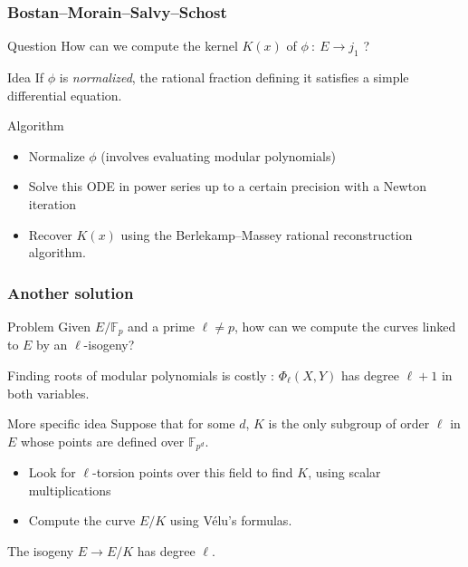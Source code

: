 \documentclass[12pt]{beamer}
\newcommand{\F}{\ensuremath{\mathbb{F}}}
\begin{document}
\begin{frame}
 \frametitle{Bostan--Morain--Salvy--Schost \cite{BMSS}}
 
 \vspace{-3mm}
 \begin{alertblock}{Question}
  How can we compute the kernel $K(x)$ of $\phi\ :\ E \to j_1$ ?
 \end{alertblock}
 
 \pause
 
 \begin{block}{Idea}
  If $\phi$ is \emph{normalized}, the rational fraction defining it satisfies a simple differential equation.
 \end{block}
 
 \pause
 
 \begin{block}{Algorithm}
  \begin{itemize}
   \item Normalize $\phi$ (involves evaluating modular polynomials)
   \item Solve this ODE in power series up to a certain precision with a \alert{Newton iteration}
   \item Recover $K(x)$ using the Berlekamp--Massey rational reconstruction algorithm.
  \end{itemize}
 \end{block}
\end{frame}



\begin{frame}
 \frametitle{Another solution}
 
 \vspace{-3mm}
 
 \begin{alertblock}{Problem}
  Given $E/\F_p$ and a prime $\ell\neq p$, how can we compute the curves linked to $E$ by an $\ell$-isogeny?
 \end{alertblock}

 Finding roots of modular polynomials is costly : $\Phi_\ell(X, Y)$ has degree $\ell + 1$ in both variables. 
 
 \pause
 
 \begin{block}{More specific idea}
  Suppose that for some $d$, $K$ is the only subgroup of order $\ell$ in $E$ whose points are defined over $\F_{p^d}$. 
  \begin{itemize}
   \item Look for $\ell$-torsion points over this field to find $K$, using scalar multiplications
   \item Compute the curve $E/K$ using V\'elu's formulas.
  \end{itemize}
  The isogeny $E\to E/K$ has degree $\ell$.
 \end{block}
\end{frame}
\end{document}
